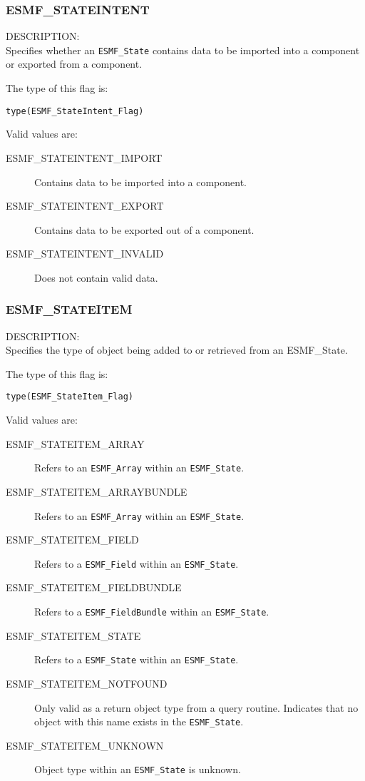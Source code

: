 
\subsubsection{ESMF\_STATEINTENT}
\label{const:stateintent}

{\sf DESCRIPTION:\\}
Specifies whether an {\tt ESMF\_State} contains data to be imported
into a component or exported from a component. 

The type of this flag is:

{\tt type(ESMF\_StateIntent\_Flag)}

Valid values are:
\begin{description}
   \item [ESMF\_STATEINTENT\_IMPORT] 
         Contains data to be imported into a component.
   \item [ESMF\_STATEINTENT\_EXPORT]
         Contains data to be exported out of a component.
   \item [ESMF\_STATEINTENT\_INVALID]
         Does not contain valid data.
\end{description}

\subsubsection{ESMF\_STATEITEM}
\label{const:stateitem}

{\sf DESCRIPTION:\\}
Specifies the type of object being added to or retrieved from an
{ESMF\_State.}

The type of this flag is:

{\tt type(ESMF\_StateItem\_Flag)}

Valid values are:
\begin{description}
   \item [ESMF\_STATEITEM\_ARRAY]
         Refers to an {\tt ESMF\_Array} within an {\tt ESMF\_State}.
   \item [ESMF\_STATEITEM\_ARRAYBUNDLE]
         Refers to an {\tt ESMF\_Array} within an {\tt ESMF\_State}.
   \item [ESMF\_STATEITEM\_FIELD]
         Refers to a {\tt ESMF\_Field} within an {\tt ESMF\_State}.
   \item [ESMF\_STATEITEM\_FIELDBUNDLE] 
         Refers to a {\tt ESMF\_FieldBundle} within an {\tt ESMF\_State}.
   \item [ESMF\_STATEITEM\_STATE]
         Refers to a {\tt ESMF\_State} within an {\tt ESMF\_State}.
   \item [ESMF\_STATEITEM\_NOTFOUND]
         Only valid as a return object type from a query routine.  Indicates
         that no object with this name exists in the {\tt ESMF\_State}.
   \item [ESMF\_STATEITEM\_UNKNOWN]
         Object type within an {\tt ESMF\_State} is unknown.
\end{description}













